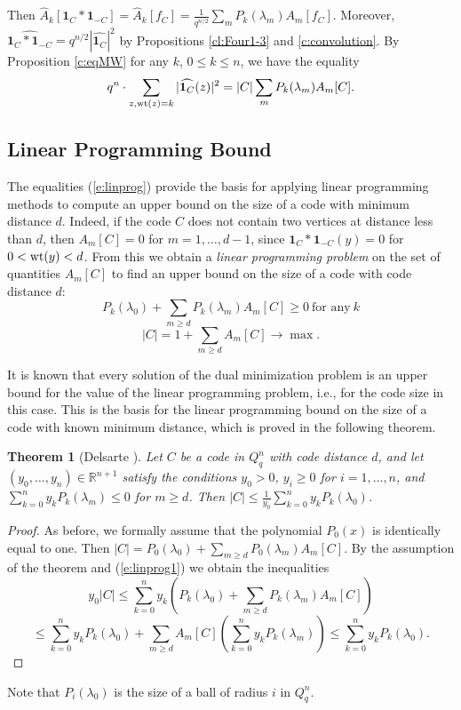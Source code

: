\documentclass[11pt]{article}
\newtheorem{theorem}{Theorem}[section]
\theoremstyle{definition}
\newcommand{\wt}{{\rm wt}}
\begin{document}
{{{Then
$\widehat{A}_k[{\mathbf 1}_{C}\ast{\mathbf 1}_{-C}]=\widehat{A}_k[f_{C}]=
\frac{1}{q^{n/2}}\sum\limits_m P_k(\lambda_m)A_m[f_C]$. Moreover,
$\widehat{{\mathbf 1}_{C}\ast{\mathbf 1}_{-C}}=
q^{n/2}|\widehat{{\mathbf 1}_C}|^2$ by Propositions \ref{cl:Four1-3} and \ref{c:convolution}.
By Proposition \ref{c:eqMW} for any $k$, $0\leq k\leq n$, we have the equality
\begin{equation}\label{e:linprog}
q^n\cdot\sum\limits_{z,\wt(z)=k}|\widehat{{\mathbf 1}_C}(z)|^2=|C|\sum\limits_m
P_k(\lambda_m)A_m[C].
\end{equation}


\subsection{Linear Programming Bound}\label{sec:LPB}

The equalities (\ref{e:linprog}) provide the basis for applying linear programming methods to compute an upper bound on the size of a code with minimum distance $d$. Indeed, if the code $C$ does not contain two vertices at distance less than $d$, then $A_m[C]=0$ for $m=1,\dots,d-1$, since ${\mathbf 1}_{C}\ast{\mathbf 1}_{-C}(y)=0$ for $0<\wt(y)<d$. From this we obtain a {\sl linear programming problem} on the set of quantities $A_m[C]$ to find an upper bound on the size of a code with code distance $d$:
\begin{equation}\label{e:linprog1}
P_k(\lambda_0)+\sum\limits_{m\geq d} P_k(\lambda_m)A_m[C]\geq 0\
\text{for any} \ k
\end{equation}
$$|C|=1+\sum\limits_{m\geq d}A_m[C]\rightarrow \max.$$



It is known that
every solution of the dual minimization problem is an upper bound for the value of the linear programming problem, i.e., for the code size in this case. This is the basis for the linear programming bound on the size of a code with known minimum distance, which is proved in the following theorem.

\begin{theorem}[Delsarte \cite{Delsarte}]\label{thDelsart1}
Let $C$ be a code in  $Q^n_q$ with code distance $d$, and let 
 $(y_0,\dots,y_n)\in \mathbb{R}^{n+1}$ satisfy the conditions $y_0>0$, $y_i\geq 0$ 
 for $i=1,\dots,n$, and $\sum\limits_{k=0}^ny_kP_k(\lambda_m)\leq 0$ for $m\geq d$. 
 Then $|C|\leq \frac{1}{y_0}\sum\limits_{k=0}^n y_kP_k(\lambda_0)$.
\end{theorem}
\begin{proof}
As before, we formally assume that the polynomial $P_0(x)$ is identically equal to one. Then $|C|=P_0(\lambda_0)+\sum\limits_{m\geq d} P_0(\lambda_m)A_m[C]$. By the assumption of the theorem and  (\ref{e:linprog1}) we obtain the inequalities
$$ y_0|C|\leq
\sum\limits_{k=0}^ny_k\left(P_k(\lambda_0)+\sum\limits_{m\geq d}
P_k(\lambda_m)A_m[C]\right) $$
$$\leq\sum\limits_{k=0}^ny_kP_k(\lambda_0) +\sum\limits_{m\geq
d}A_m[C]\left(\sum\limits_{k=0}^ny_kP_k(\lambda_m)\right)\leq
\sum\limits_{k=0}^n y_kP_k(\lambda_0).$$
\end{proof}
Note that $P_i(\lambda_0)$ is the size of a ball of radius $i$ in $Q^n_q$. 

}}}
\end{document}
